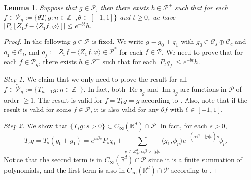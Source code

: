 \documentclass[12pt,a4paper]{amsart}
\theoremstyle{plain}
\newtheorem{lem}[thm]{Lemma}
\theoremstyle{definition}
\numberwithin{equation}{section}
\begin{document}
\begin{lem}
\label{lem:P:R}
Suppose that $g \in \mathcal P$, then there exists
 $h \in \mathcal P^+$ such that for each
\(
f
\in \mathcal P_g
:= \{\theta T_n g: n \in \mathbb Z_+, \theta \in [-1,1]\}
\)
and $t\geq 0$, we have
\(
\big | P_t [ Z_1 f - \langle Z_1 f, \varphi \rangle ]\big|
 \leq e^{-bt} h.
\)
\end{lem}
\begin{proof}
In the following $g \in \mathcal P$ is fixed. We write  $g = g_0 + g_1$ with $g_0 \in \mathcal C_s \oplus \mathcal C_c$ and $g_1 \in \mathcal C_l$,  and $q_f:=Z_1f - \langle Z_1f, \varphi \rangle\in \mathcal P^*$ for each $f\in \mathcal P$. We need  to prove that for each
$f\in \mathcal P_g$,  there exists  $h \in \mathcal P^+$ such that for each $|P_tq_f| \leq e^{-bt} h.$

  \emph{Step 1.}
  We claim  that we only need to prove the result for all
  $f \in \widetilde{\mathcal P}_g:= \{T_{n+1} g : n \in \mathbb Z_+\}$.
 In fact, both $\operatorname{Re} q_g$ and $\operatorname{Im} q_g$ are functions in $\mathcal P$ of order $\geq 1$.
The result is valid for $f = T_0 g = g$ according to  \cite[Fact 1.2]{MarksMilos2018CLT}.
Also, note that if the result is valid for some $f \in \mathcal P$, it is also valid for any $\theta f$ with $\theta \in [-1,1]$.


\emph{Step 2.} We show that $\{T_s g: s> 0\} \subset C_\infty (\mathbb R^d) \cap \mathcal P$.
In fact, for each $s > 0$,
\[
  T_s g
  = T_s (g_0 + g_1)
  = e^{\alpha \tilde \beta s}P_s g_0 + \sum_{p \in \mathbb Z_+^d: \alpha \tilde \beta > |p|b} \langle g_1, \phi_p \rangle e^{-(\alpha \tilde \beta - |p|b)s} \phi_p.
\]
Notice that the second term is in $C_\infty(\mathbb R^d)\cap \mathcal P$ since it is a finite summation of polynomials, and the first term is also in $C_\infty (\mathbb R^d) \cap \mathcal P$ according to \cite[Fact 1.1]{MarksMilos2018CLT}.


\end{proof}
\end{document}
